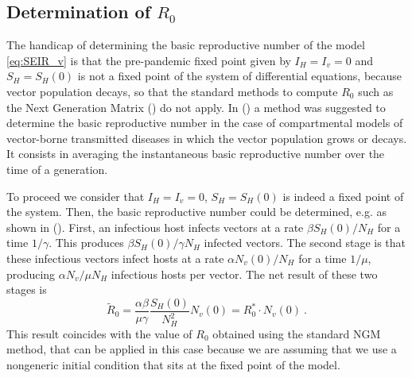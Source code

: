 \subsection{Determination of $R_0$}\label{app:R0}

The handicap of determining the basic reproductive number of the model
\cref{eq:SEIR_v} is that the pre-pandemic fixed point given by $I_H=I_v=0$ and
$S_H=S_H(0)$ is not a fixed point of the system of differential equations,
because vector population decays, so that the standard methods to compute $R_0$
such as the Next Generation Matrix (\cite{Diekmann2010, GimenezRomero2022_PRE})
do not
apply. In (\cite{GimenezRomero2022_PRE}) a method was suggested to determine
the basic
reproductive number in the case of compartmental models of vector-borne
transmitted diseases in which the vector population grows or decays. It
consists in averaging the instantaneous basic reproductive number over the time
of a generation.

To proceed we consider that $I_H=I_v=0$, $S_H=S_H(0)$ is indeed a fixed
point of the system. Then, the basic reproductive number could be determined,
e.g. as shown in (\cite{Brauer2016}). First, an infectious host infects vectors
at a rate $\beta S_H(0)/N_H$ for a time $1/\gamma$. This produces $\beta
    S_H(0)/\gamma N_H$ infected vectors. The second stage is that these
infectious
vectors infect hosts at a rate $\alpha N_v(0)/N_H$ for a time $1/\mu$,
producing $\alpha N_v/\mu N_H$ infectious hosts per vector. The net result of
these two stages is
\begin{equation}
    \tilde{R}_0=\frac{\alpha\beta}{\mu\gamma}
    \frac{S_H(0)}{N_H^2}N_v(0)=R_0^*
    \cdot
    N_v(0)\ .
    \label{eq:R0tilde}
\end{equation}
This result coincides with the value of $R_0$ obtained using the standard
NGM method, that can be applied in this case because we are assuming that we
use a nongeneric initial condition that sits at the fixed point of the model.


